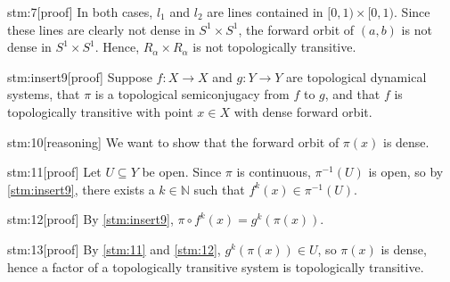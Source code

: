 \documentclass{article}
\begin{document}
\begin{stm}{stm:7}[proof]
In both cases, $l_1$ and $l_2$ are lines contained in $[0,1) \times [0,1)$. Since these lines are clearly not dense in $S^1 \times S^1$, the forward orbit of $(a,b)$ is not dense in $S^1 \times S^1$. Hence, $R_\alpha \times R_\alpha$ is not topologically transitive.
\end{stm}

\begin{stm}{stm:insert9}[proof]
Suppose $f: X \to X$ and $g: Y \to Y$ are topological dynamical systems, that $\pi$ is a topological semiconjugacy from $f$ to $g$, and that $f$ is topologically transitive with point $x \in X$ with dense forward orbit.
\end{stm}

\begin{stm}{stm:10}[reasoning]
We want to show that the forward orbit of $\pi(x)$ is dense.
\end{stm}

\begin{stm}{stm:11}[proof]
Let $U \subseteq Y$ be open. Since $\pi$ is continuous, $\pi^{-1}(U)$ is open, so by \ref{stm:insert9}, there exists a $k \in \mathbb{N}$ such that $f^k(x) \in \pi^{-1}(U)$.
\end{stm}

\begin{stm}{stm:12}[proof]
By \ref{stm:insert9}, $\pi \circ f^k(x) = g^k(\pi(x))$.
\end{stm}

\begin{stm}{stm:13}[proof]
By \ref{stm:11} and \ref{stm:12}, $g^k(\pi(x)) \in U$, so $\pi(x)$ is dense, hence a factor of a topologically transitive system is topologically transitive.
\end{stm}
\end{document}
